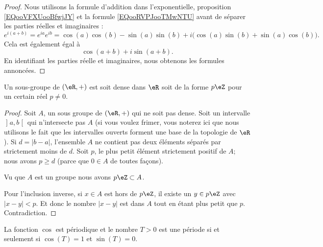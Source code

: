 \begin{proof}
    Nous utilisons la formule d'addition dans l'exponentielle, proposition \eqref{EQooVFXUooBfwjJY} et la formule \eqref{EQooRVPJooTMwNTU} avant de séparer les parties réelles et imaginaires :
    \begin{equation}
        e^{i(a+b)}= e^{ia} e^{ib}=\cos(a)\cos(b)-\sin(a)\sin(b)+i\big( \cos(a)\sin(b)+\sin(a)\cos(b) \big).
    \end{equation}
    Cela est également égal à
    \begin{equation}
        \cos(a+b)+i\sin(a+b).
    \end{equation}
    En identifiant les parties réelle et imaginaires, nous obtenons les formules annoncées.
\end{proof}

\begin{lemma}       \label{LEMooPQWWooMdPWUT}
    Un sous-groupe de \( (\eR,+)\) est soit dense dans \( \eR\) soit de la forme \( p\eZ\) pour un certain réel \( p\neq 0\).
\end{lemma}

\begin{proof}
    Soit \( A\), un sous groupe de \( (\eR,+)\) qui ne soit pas dense. Soit un intervalle \( \mathopen] a , b \mathclose[\) qui n'intersecte pas \( A\) (si vous voulez frimer, vous noterez ici que nous utilisons le fait que les intervalles ouverts forment une base de la topologie de \( \eR\)). Si \( d=| b-a |\), l'ensemble \( A\) ne contient pas deux éléments séparés par strictement moins de \( d\). Soit \( p\), le plus petit élément strictement positif de \( A\); nous avons \( p\geq d\) (parce que \( 0\in A\) de toutes façons).

        Vu que \( A\) est un groupe nous avons \( p\eZ\subset A\).

        Pour l'inclusion inverse, si \( x\in A\) est hors de \( p\eZ\), il existe un \( y\in p\eZ\) avec \( | x-y |<p\). Et donc le nombre \( | x-y |\) est dans \( A\) tout en étant plus petit que \( p\). Contradiction.
\end{proof}

\begin{proposition}      \label{PROPooFRVCooKSgYUM}
    La fonction \( \cos\) est périodique et le nombre \( T>0\) est une période si et seulement si \( \cos(T)=1\) et \( \sin(T)=0\).
\end{proposition}

